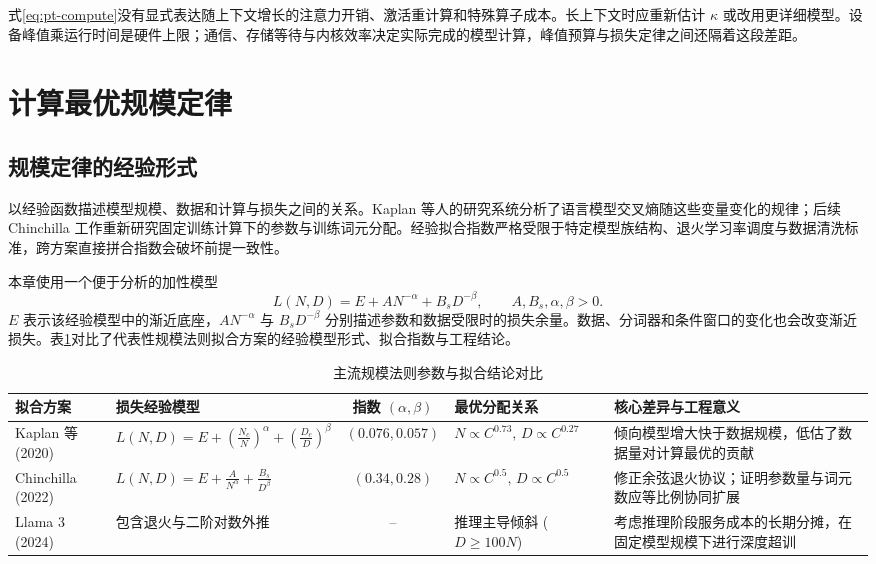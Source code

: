 \documentclass[../textbook.tex]{subfiles}
\begin{document}
式\eqref{eq:pt-compute}没有显式表达随上下文增长的注意力开销、激活重计算和特殊算子成本。长上下文时应重新估计 $\kappa$ 或改用更详细模型。设备峰值乘运行时间是硬件上限；通信、存储等待与内核效率决定实际完成的模型计算，峰值预算与损失定律之间还隔着这段差距。

\section{计算最优规模定律}

\subsection{规模定律的经验形式}
以经验函数描述模型规模、数据和计算与损失之间的关系。Kaplan 等人的研究系统分析了语言模型交叉熵随这些变量变化的规律\cite{kaplan2020scaling}；后续 Chinchilla 工作重新研究固定训练计算下的参数与训练词元分配\cite{hoffmann2022chinchilla}。经验拟合指数严格受限于特定模型族结构、退火学习率调度与数据清洗标准，跨方案直接拼合指数会破坏前提一致性。

本章使用一个便于分析的加性模型
\begin{equation}
 L(N,D)=E+A N^{-\alpha}+B_sD^{-\beta},\qquad
 A,B_s,\alpha,\beta>0.
 \label{eq:pt-scaling}
\end{equation}
$E$ 表示该经验模型中的渐近底座，$AN^{-\alpha}$ 与 $B_sD^{-\beta}$ 分别描述参数和数据受限时的损失余量。数据、分词器和条件窗口的变化也会改变渐近损失。表\ref{tab:scaling-laws-comparison}对比了代表性规模法则拟合方案的经验模型形式、拟合指数与工程结论。

\begin{table}[htbp]
\centering
\small
\setlength{\tabcolsep}{3.5pt}
\caption{主流规模法则参数与拟合结论对比}
\label{tab:scaling-laws-comparison}
\begin{tabularx}{\linewidth}{lp{28mm}cp{24mm}X}
\toprule
拟合方案 & 损失经验模型 & 指数 $(\alpha, \beta)$ & 最优分配关系 & 核心差异与工程意义 \\
\midrule
Kaplan 等 (2020) & $L(N,D)=E+(\frac{N_c}{N})^\alpha+(\frac{D_c}{D})^\beta$ & $(0.076, 0.057)$ & $N \propto C^{0.73},\, D \propto C^{0.27}$ & 倾向模型增大快于数据规模，低估了数据量对计算最优的贡献 \\
Chinchilla (2022) & $L(N,D)=E+\frac{A}{N^\alpha}+\frac{B_s}{D^\beta}$ & $(0.34, 0.28)$ & $N \propto C^{0.5},\, D \propto C^{0.5}$ & 修正余弦退火协议；证明参数量与词元数应等比例协同扩展 \\
Llama 3 (2024) & 包含退火与二阶对数外推 & -- & 推理主导倾斜 ($D \ge 100N$) & 考虑推理阶段服务成本的长期分摊，在固定模型规模下进行深度超训 \\
\bottomrule
\end{tabularx}
\end{table}
\end{document}
